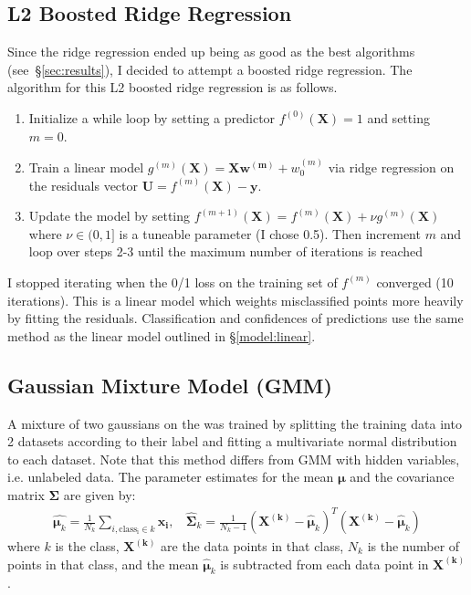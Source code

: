 \documentclass{article} %
\newcommand{\vect}[1]{\mathbf{#1}}
\newcommand{\mat}[1]{\mathbf{#1}}
\begin{document}
\subsection{L2 Boosted Ridge Regression}
\label{model:l2boost}
Since the ridge regression ended up being as good as the best algorithms (see~\S\ref{sec:results}), I decided to attempt a boosted ridge regression.  The algorithm for this L2 boosted ridge regression is as follows.
\begin{enumerate}
	\itemsep-0.2em 
	\item Initialize a while loop by setting a predictor $f^{(0)}(\mat{X}) = 1 $ and setting $m=0$.
	\item Train a linear model $g^{(m)}(\mat{X}) = \mat{X}\vect{w^{(m)}} + w_0^{(m)}$ via ridge regression on the residuals vector $\vect{U} = f^{(m)}(\mat{X}) - \vect{y}$. 
	\item Update the model by setting $f^{(m+1)}(\mat{X}) = f^{(m)}(\mat{X}) + \nu g^{(m)}(\mat{X})$ where $\nu \in (0, 1]$ is a tuneable parameter (I chose 0.5).  Then increment $m$ and loop over steps 2-3 until the maximum number of iterations is reached
\end{enumerate}
I stopped iterating when the 0/1 loss on the training set of $f^{(m)}$ converged (10 iterations).  This is a linear model which weights misclassified points more heavily by fitting the residuals.  Classification and confidences of predictions use the same method as the linear model outlined in \S\ref{model:linear}.

\subsection{Gaussian Mixture Model (GMM)}
\label{model:gmm}
A mixture of two gaussians on the was trained by splitting the training data into 2 datasets according to their label and fitting a multivariate normal distribution to each dataset.  Note that this method differs from GMM with hidden variables, i.e. unlabeled data. The parameter estimates for the mean $\vect{\mu}$ and the covariance matrix $\mat{\Sigma}$ are given by:
\begin{equation}
\begin{aligned}
	\hat{\vect{\mu}_k} = \frac{1}{N_k} \sum_{i, \mathrm{class_i} \in k} \vect{x_i},~~~~	\mat{\hat{\Sigma}}_k = \frac{1}{N_k-1} (\mat{X^{(k)}} - \vect{\hat{\mu}}_k)^T (\mat{X^{(k)}} - \vect{\hat{\mu}}_k)
\end{aligned}
\end{equation}
where $k$ is the class, $\mat{X^{(k)}}$ are the data points in that class, $N_k$ is the number of points in that class, and the mean $\hat{\vect{\mu}}_k$ is subtracted from each data point in $\mat{X^{(k)}}$.
\end{document}
